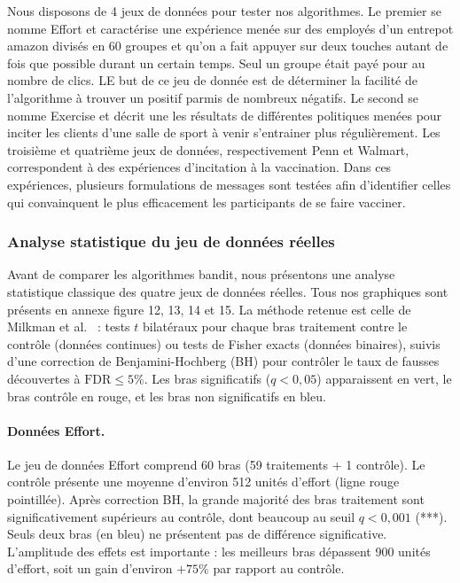 \documentclass[10.5pt,a4paper]{article}
\begin{document}
Nous disposons de 4 jeux de données pour tester nos algorithmes. 
Le premier se nomme Effort et caractérise une expérience menée sur des employés d'un entrepot amazon divisés en 60 groupes et qu'on a fait appuyer sur deux touches autant de fois que possible durant un certain temps. Seul un groupe était payé pour au nombre de clics. LE but de ce jeu de donnée est de déterminer la facilité de l'algorithme à trouver un positif parmis de nombreux négatifs.
Le second se nomme Exercise et décrit une les résultats de différentes politiques menées pour inciter les clients d'une salle de sport à venir s'entrainer plus régulièrement.
Les troisième et quatrième jeux de données, respectivement Penn et Walmart, correspondent à des expériences d’incitation à la vaccination. Dans ces expériences, plusieurs formulations de messages sont testées afin d’identifier celles qui convainquent le plus efficacement les participants de se faire vacciner.

\subsubsection{Analyse statistique du jeu de données réelles}

Avant de comparer les algorithmes bandit, nous présentons une analyse statistique classique des quatre jeux de données réelles. Tous nos graphiques sont présents en annexe figure 12, 13, 14 et 15. 
La méthode retenue est celle de Milkman et al.~\cite{milkman2021nature} : tests $t$ bilatéraux pour chaque bras traitement contre le contrôle (données continues) ou tests de Fisher exacts (données binaires), suivis d'une correction de Benjamini-Hochberg (BH) pour contrôler le taux de fausses découvertes à $\text{FDR} \leq 5\%$. Les bras significatifs ($q < 0{,}05$) apparaissent en vert, le bras contrôle en rouge, et les bras non significatifs en bleu.

\paragraph{Données Effort.}



Le jeu de données Effort comprend 60 bras (59 traitements + 1 contrôle). Le contrôle présente une moyenne d'environ 512 unités d'effort (ligne rouge pointillée). Après correction BH, la grande majorité des bras traitement sont significativement supérieurs au contrôle, dont beaucoup au seuil $q < 0{,}001$ (***). Seuls deux bras (en bleu) ne présentent pas de différence significative. L'amplitude des effets est importante : les meilleurs bras dépassent 900 unités d'effort, soit un gain d'environ $+75\%$ par rapport au contrôle.
\end{document}
